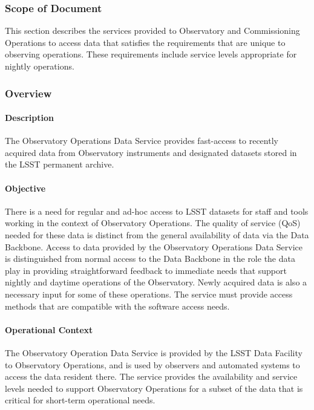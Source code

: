 \subsubsection{Scope of Document}
This section describes the services provided to Observatory and Commissioning
Operations to access data that satisfies the requirements that
are unique to observing operations. These requirements include
service levels appropriate for nightly operations.

\subsubsection{Overview}

\paragraph{Description}

The Observatory Operations Data Service provides fast-access to
recently acquired data from Observatory instruments and designated
datasets stored in the LSST permanent archive.

\paragraph{Objective}

There is a need for regular and ad-hoc access to LSST datasets for
staff and tools working in the context of Observatory Operations. The
quality of service (QoS) needed for these data is distinct from the general
availability of data via the Data Backbone. Access to data provided by the
Observatory Operations Data Service is distinguished from normal access
to the Data Backbone in the role the data play in providing straightforward
feedback to immediate needs that support nightly and daytime operations of
the Observatory. Newly acquired data is also a necessary input for some of
these operations. The service must provide access methods that are compatible
with the software access needs.

\paragraph{Operational Context}

The Observatory Operation Data Service is provided by the LSST Data
Facility to Observatory Operations, and is used by observers and
automated systems to access the data resident there. The service
provides the availability and service levels needed to support
Observatory Operations for a subset of the data that is critical for
short-term operational needs.

